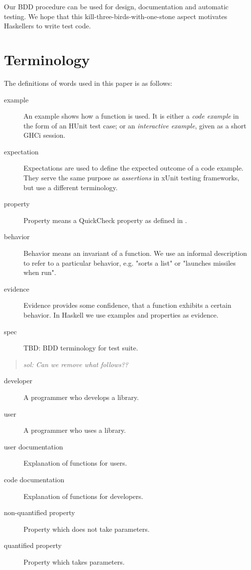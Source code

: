\documentclass[preprint]{sigplanconf}
\begin{document}
\noindent Our BDD procedure
can be used for design, documentation and automatic testing.
We hope that this kill-three-birds-with-one-stone aspect
motivates Haskellers to write test code.

\section{Terminology}

The definitions of words used in this paper is as follows:

\begin{description}

\item[example]
    An example shows how a function is used.  It is either a \emph{code
    example} in the form of an HUnit test case; or an \emph{interactive
    example}, given as a short GHCi session.

\item[expectation]
    Expectations are used to define the expected outcome of a code
    example.  They serve the same purpose as \emph{assertions} in xUnit
    testing frameworks, but use a different terminology.

\item[property]
    Property means a QuickCheck property as defined in
    \cite{quickcheck}.

\item[behavior]
    Behavior means an invariant of a function.  We use an informal description
    to refer to a particular behavior, e.g.  "sorts a list" or "launches
    missiles when run".

\item[evidence]
    Evidence provides some confidence, that a function exhibits a
    certain behavior.  In Haskell we use examples and properties as
    evidence.

\item[spec]
    TBD: BDD terminology for test suite.
\end{description}


\begin{quote}
    \emph{sol: Can we remove what follows??}
\end{quote}

\begin{description}
\item[developer]
    A programmer who develops a library.

\item[user]
    A programmer who uses a library.


\item[user documentation]
    Explanation of functions for users.
\item[code documentation]
    Explanation of functions for developers.

\item[non-quantified property]
    Property which does not take parameters.

\item[quantified property]
    Property which takes parameters.

\end{description}
\end{document}
